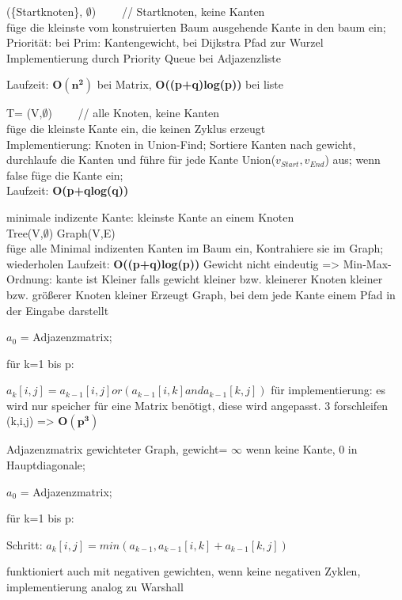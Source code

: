  (\{Startknoten\}, $\emptyset$) ~~~~// Startknoten, keine Kanten\\
 füge die kleinste vom konstruierten Baum ausgehende Kante in den baum ein;\\
Priorität: bei Prim: Kantengewicht, bei Dijkstra Pfad zur Wurzel\\
Implementierung durch Priority Queue bei Adjazenzliste

Laufzeit: $\mathbf{O(n^2)}$ bei Matrix, \textbf{O((p+q)log(p))} bei liste

 T= (V,$\emptyset$) ~~~~// alle Knoten, keine Kanten\\
 füge die kleinste Kante ein, die keinen Zyklus erzeugt\\
Implementierung: Knoten in Union-Find; Sortiere Kanten nach gewicht, durchlaufe die Kanten und führe für jede Kante Union($v_{Start},v_{End}$) aus; wenn false füge die Kante ein;\\
Laufzeit: \textbf{O(p+qlog(q))}

minimale indizente Kante: kleinste Kante an einem Knoten\\
 Tree(V,$\emptyset$) Graph(V,E)\\
 füge alle Minimal indizenten Kanten im Baum ein, Kontrahiere sie im Graph; wiederholen
Laufzeit: \textbf{O((p+q)log(p))}
Gewicht nicht eindeutig => Min-Max-Ordnung: kante ist Kleiner falls gewicht kleiner bzw. kleinerer Knoten kleiner bzw. größerer Knoten kleiner
Erzeugt Graph, bei dem jede Kante einem Pfad in der Eingabe darstellt


 $a_0$ = Adjazenzmatrix;

für k=1 bis p: 

 $a_k[i,j] = a_{k-1}[i,j] or( a_{k-1}[i,k] and a_{k-1}[k,j] )$
für implementierung: es wird nur speicher für eine Matrix benötigt, diese wird angepasst. 3 forschleifen (k,i,j) => 
$\mathbf{O(p^3)}$

Adjazenzmatrix gewichteter Graph, gewicht= $\infty$ wenn keine Kante, 0 in Hauptdiagonale;

 $a_0$ = Adjazenzmatrix;

für k=1 bis p: 

 Schritt: $a_k[i,j] = min(a_{k-1} , a_{k-1}[i,k] + a_{k-1}[k,j] )$

funktioniert auch mit negativen gewichten, wenn keine negativen Zyklen, implementierung analog zu Warshall
